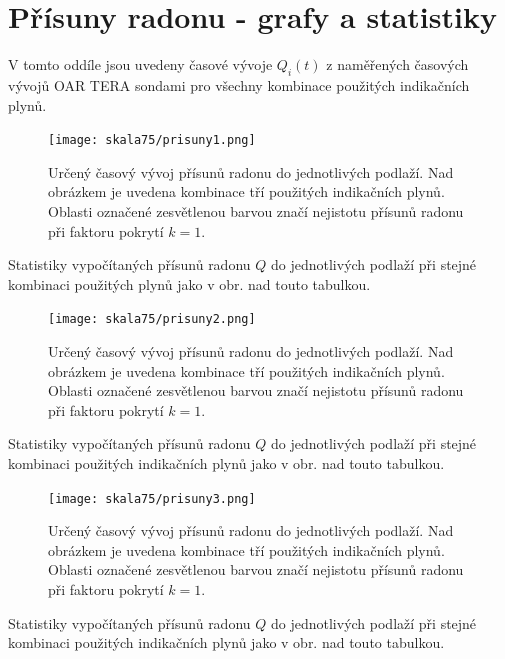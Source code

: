 \section{Přísuny radonu - grafy a statistiky}\label{navesti:priloha_skala75_prisuny}
V tomto oddíle jsou uvedeny časové vývoje $Q_i(t)$ z naměřených časových vývojů OAR TERA sondami pro všechny kombinace použitých indikačních plynů.
\begin{figure}[H]
    \centering
    \texttt{[image: skala75/prisuny1.png]}
    \caption{Určený časový vývoj přísunů radonu do jednotlivých podlaží. Nad obrázkem je uvedena kombinace tří použitých indikačních plynů. Oblasti označené zesvětlenou barvou značí nejistotu přísunů radonu při faktoru pokrytí $k=1$.}
    \label{fig:skala75_prisuny1}
\end{figure}
\begin{table}[H]
    \centering
    \caption{Statistiky vypočítaných přísunů radonu $Q$ do jednotlivých podlaží při stejné kombinaci použitých plynů jako v obr. nad touto tabulkou.}
    \label{tab:skala75_prisuny1}
    
\end{table}

\begin{figure}[H]
    \centering
    \texttt{[image: skala75/prisuny2.png]}
    \caption{Určený časový vývoj přísunů radonu do jednotlivých podlaží. Nad obrázkem je uvedena kombinace tří použitých indikačních plynů. Oblasti označené zesvětlenou barvou značí nejistotu přísunů radonu při faktoru pokrytí $k=1$.}
    \label{fig:skala75_prisuny2}
\end{figure}
\begin{table}[H]
    \centering
    \caption{Statistiky vypočítaných přísunů radonu $Q$ do jednotlivých podlaží při stejné kombinaci použitých indikačních plynů jako v obr. nad touto tabulkou.}
    \label{tab:skala75_prisuny2}
    
\end{table}

\begin{figure}[H]
    \centering
    \texttt{[image: skala75/prisuny3.png]}
    \caption{Určený časový vývoj přísunů radonu do jednotlivých podlaží. Nad obrázkem je uvedena kombinace tří použitých indikačních plynů. Oblasti označené zesvětlenou barvou značí nejistotu přísunů radonu při faktoru pokrytí $k=1$.}
    \label{fig:skala75_prisuny3}
\end{figure}
\begin{table}[H]
    \centering
    \caption{Statistiky vypočítaných přísunů radonu $Q$ do jednotlivých podlaží při stejné kombinaci použitých indikačních plynů jako v obr. nad touto tabulkou.}
    \label{tab:skala75_prisuny3}
    
\end{table}

